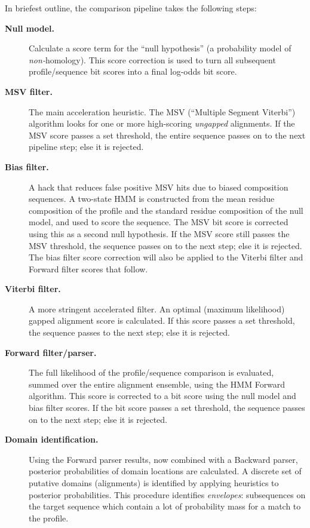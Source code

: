 In briefest outline, the comparison pipeline takes the following
steps:

\begin{description}
\item[\textbf{Null model.}] Calculate a score term for the ``null
  hypothesis'' (a probability model of \emph{non-}homology). This
  score correction is used to turn all subsequent profile/sequence bit
  scores into a final log-odds bit score.
  
\item[\textbf{MSV filter.}] The main acceleration heuristic. The MSV
  (``Multiple Segment Viterbi'') algorithm looks for one or more
  high-scoring \emph{ungapped} alignments. If the MSV score passes a
  set threshold, the entire sequence passes on to the next pipeline
  step; else it is rejected.

\item[\textbf{Bias filter.}] A hack that reduces false positive MSV
  hits due to biased composition sequences. A two-state HMM is
  constructed from the mean residue composition of the profile and the
  standard residue composition of the null model, and used to score
  the sequence. The MSV bit score is corrected using this as a second
  null hypothesis. If the MSV score still passes the MSV threshold,
  the sequence passes on to the next step; else it is rejected.  The
  bias filter score correction will also be applied to the Viterbi
  filter and Forward filter scores that follow.
  
\item[\textbf{Viterbi filter.}] A more stringent accelerated filter.
  An optimal (maximum likelihood) gapped alignment score is
  calculated. If this score passes a set threshold, the sequence
  passes to the next step; else it is rejected.

\item[\textbf{Forward filter/parser.}] The full likelihood of the
  profile/sequence comparison is evaluated, summed over the entire
  alignment ensemble, using the HMM Forward algorithm. This score is
  corrected to a bit score using the null model and bias filter
  scores. If the bit score passes a set threshold, the sequence passes
  on to the next step; else it is rejected.

\item[\textbf{Domain identification.}] Using the Forward parser
  results, now combined with a Backward parser, posterior
  probabilities of domain locations are calculated. A discrete set of
  putative domains (alignments) is identified by applying heuristics
  to posterior probabilities. This procedure identifies
  \emph{envelopes}: subsequences on the target sequence which contain
  a lot of probability mass for a match to the profile.


\end{description}
